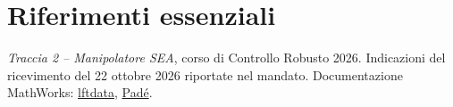 \section{Riferimenti essenziali}
\emph{Traccia 2 -- Manipolatore SEA}, corso di Controllo Robusto 2026.
Indicazioni del ricevimento del 22 ottobre 2026 riportate nel mandato.
Documentazione MathWorks:
\href{https://www.mathworks.com/help/robust/ref/inputoutputmodel.lftdata.html}{lftdata},
\href{https://www.mathworks.com/help/control/ref/dynamicsystem.pade.html}{Padé}.
